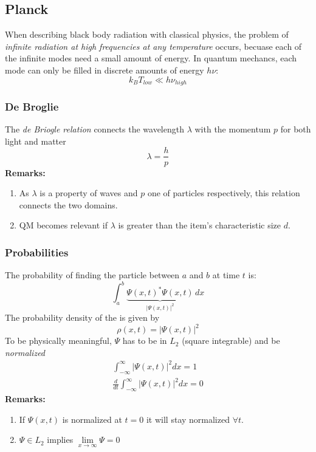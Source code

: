 \subsection{Planck}
When describing black body radiation with classical physics, the problem of \textit{infinite radiation at
    high frequencies at any temperature} occurs, becuase each of the infinite modes need a small amount of energy.
In quantum mechancs, each mode can only be filled in discrete amounts of energy $h \nu$:
\begin{equation*}
    k_B T_{low} \ll h\nu_{high}
\end{equation*}

\subsubsection{De Broglie}
The \textit{de Briogle relation} connects the wavelength $\lambda$ with the momentum $p$ for both light and matter
\begin{equation*}
    \lambda = \frac{h}{p}
\end{equation*}
\textbf{Remarks:}
\begin{enumerate}
    \item As $\lambda$ is a property of waves and $p$ one of particles respectively, this relation connects the two domains.
    \item QM becomes relevant if $\lambda$ is greater than the item's characteristic size $d$.
\end{enumerate}

\subsubsection{Probabilities}
The probability of finding the particle between $a$ and $b$ at time $t$ is:
\begin{equation*}
    \int_a^b \underbrace{{\Psi(x,t)}^*\Psi(x,t)}_{|\Psi(x,t)|^2}\,dx
\end{equation*}
The probability density of the is given by
\begin{equation*}
    \rho(x,t) = |\Psi(x,t)|^2
\end{equation*}
To be physically meaningful, $\Psi$ has to be in $L_2$ (square integrable) and be \textit{normalized}
\begin{align*}
    \int_{-\infty}^{\infty} |\Psi(x,t)|^2 dx = 1 \\
    \frac{d}{dt}\int_{-\infty}^{\infty} |\Psi(x,t)|^2 dx = 0
\end{align*}
\textbf{Remarks:}
\begin{enumerate}
    \item If $\Psi(x,t)$ is normalized at $t=0$ it will stay normalized $\forall t$.
    \item $\Psi \in L_2$ implies $\lim \limits_{x \to \infty}\Psi=0$
\end{enumerate}


